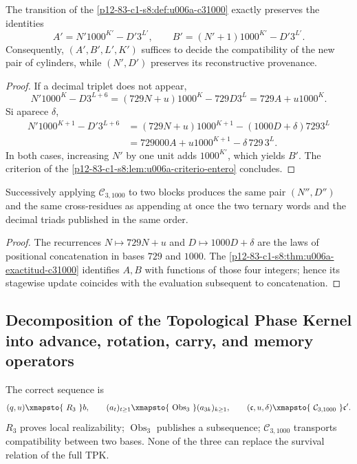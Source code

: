 {\begin{theorem}
\label{p12-83-c1-s8:thm:u006a-exactitud-c31000}
The transition of the \cref{p12-83-c1-s8:def:u006a-c31000} exactly preserves the
identities
\[
 A'=N'1000^{K'}-D'3^{L'},
 \qquad
 B'=(N'+1)1000^{K'}-D'3^{L'}.
\]
Consequently, \((A',B',L',K')\) suffices to decide the compatibility of the
new pair of cylinders, while \((N',D')\) preserves its reconstructive
provenance.
\end{theorem}

\begin{proof}
If a decimal triplet does not appear,
\[
 N'1000^K-D3^{L+6}
 =(729N+u)1000^K-729D3^L
 =729A+u1000^K.
\]
Si aparece \(\delta\),
\begin{align*}
 N'1000^{K+1}-D'3^{L+6}
 &=(729N+u)1000^{K+1}-(1000D+\delta)7293^L\\
 &=729000A+u1000^{K+1}-\delta\,729\,3^L.
\end{align*}
In both cases, increasing \(N'\) by one unit adds \(1000^{K'}\), which
yields \(B'\). The criterion of the \cref{p12-83-c1-s8:lem:u006a-criterio-entero} concludes.
\end{proof}

\begin{proposition}
\label{p12-83-c1-s8:prop:u006a-concatenacion-c31000}
Successively applying \(\mathcal C_{3,1000}\) to two blocks produces the same pair
\((N'',D'')\) and the same cross-residues as appending at once the two
ternary words and the decimal triads published in the same order.
\end{proposition}

\begin{proof}
The recurrences \(N\mapsto729N+u\) and
\(D\mapsto1000D+\delta\) are the laws of positional concatenation in
bases \(729\) and \(1000\). The
\cref{p12-83-c1-s8:thm:u006a-exactitud-c31000} identifies \(A,B\) with functions of those
four integers; hence its stagewise update coincides with the
evaluation subsequent to concatenation.
\end{proof}

\subsection{Decomposition of the Topological Phase Kernel into advance, rotation, carry, and memory operators}

The correct sequence is
\[
 (q,u)\xmapsto{\ R_3\ }b,
 \qquad
 (a_t)_{t\geq1}
 \xmapsto{\ \operatorname{Obs}_3\ }
 (a_{3k})_{k\geq1},
 \qquad
 (\mathfrak c,u,\delta)
 \xmapsto{\ \mathcal C_{3,1000}\ }
 \mathfrak c'.
\]
\(R_3\) proves local realizability; \(\operatorname{Obs}_3\) publishes a
subsequence; \(\mathcal C_{3,1000}\) transports compatibility between two
bases. None of the three can replace the survival relation
of the full TPK.

}
